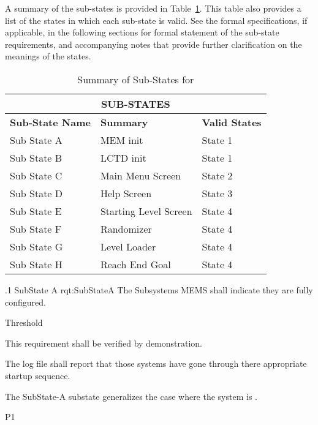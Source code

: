 A summary of the sub-states is provided in Table~\ref{tab:SubStates}.
This table also provides a list of the states in which each sub-state is valid.
See the formal specifications, if applicable, in the following sections for formal statement of the sub-state requirements, and accompanying notes that provide further clarification on the meanings of the states.
\begin{table}[h]
	\begin{center}
		\begin{tabular}{|p{1.0in}|p{4.0in}|p{1.0in}|}
			\hline
			\hline
			\multicolumn{3}{|c|}{{\bf SUB-STATES}} \\
			\hline
				{\bf Sub-State Name} & {\bf Summary} & {\bf Valid States} \\ 
			\hline
			\hline
Sub State A & MEM init & State 1 \\ \hline
Sub State B & LCTD init & State 1 \\ \hline
Sub State C & Main Menu Screen & State 2 \\ \hline
Sub State D & Help Screen & State 3 \\ \hline
Sub State E & Starting Level Screen & State 4 \\ \hline
Sub State F & Randomizer & State 4 \\ \hline
Sub State G & Level Loader & State 4 \\ \hline
Sub State H & Reach End Goal & State 4 \\ 
			\hline
			\hline
		\end{tabular}
		\caption{Summary of Sub-States for \ThisSystem}
		\label{tab:SubStates}
	\end{center}
\end{table}


\ONERQMTV
{\RqtNumberBase.1}
{SubState A}
{rqt:SubStateA}
{The Subsystems MEMS shall indicate they are fully configured.}
{
	\item [Phase 1] Threshold
}
{This requirement shall be verified by demonstration.}
{
	\item [1] The log file shall report that those systems have gone through there appropriate startup sequence.
}
{
	\item The SubState-A substate generalizes the case where the system is \TBD.
}
{P1}

